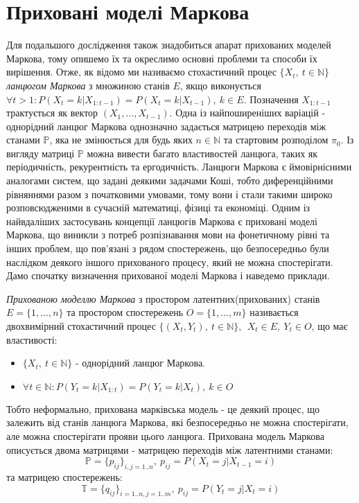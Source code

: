 \section{Приховані моделі Маркова}
Для подальшого дослідження також знадобиться апарат прихованих моделей Маркова, тому опишемо їх та окреслимо основні проблеми та способи їх вирішення.
Отже, як відомо ми називаємо стохастичний процес $ \{ X_t,\ t \in \mathbb{N} \}$ \textit{ланцюгом Маркова} з множиною станів $E$, якщо виконується $ \forall t > 1 \colon P(X_{t} = k | X_{1:t-1}) = P(X_{t} = k | X_{t-1}),\ k \in E $. Позначення $ X_{1:t-1} $ трактується як вектор $ \left( X_1,\dots,X_{t-1} \right) $.
Одна із найпоширеніших варіацій - однорідний ланцюг Маркова однозначно задається матрицею переходів між станами $\mathbb{P}$, яка не змінюється для будь яких $n \in \mathbb{N}$ та стартовим розподілом $\pi_0$. Із вигляду матриці $ \mathbb{P} $ можна вивести багато властивостей ланцюга, таких як періодичність, рекурентність та ергодичність. Ланцюги Маркова є ймовірнісними аналогами систем, що задані деякими задачами Коші, тобто диференційними рівняннями разом з початковими умовами, тому вони і стали такими широко розповсюдженими в сучасній математиці, фізиці та економіці.
Одним із найвдаліших застосувань концепції ланцюгів Маркова є приховані моделі Маркова, що виникли з потреб розпізнавання мови на фонетичному рівні та інших проблем, що пов'язані з рядом спостережень, що безпосередньо були наслідком деякого іншого прихованого процесу, який не можна спостерігати. Дамо спочатку визначення прихованої моделі Маркова і наведемо приклади.
\begin{definition}
  \textit{Прихованою моделлю Маркова} з простором латентних(прихованих) станів $E = \{ 1,\dots,n \}$ та простором спостережень $O = \{ 1,\dots,m \}$ називається двохвимірний стохастичний процес $ \{ (X_t, Y_t),\ t \in \mathbb{N} \},\ \ X_t \in E,\ Y_t \in O $, що має властивості:
  \begin{itemize}
    \item $ \{ X_t,\ t \in \mathbb{N} \} $ - однорідний ланцюг Маркова.
    \item $ \forall t \in \mathbb{N} \colon P(Y_t = k | X_{1:t}) = P(Y_t = k | X_t),\ k \in O $
  \end{itemize}
\end{definition}
Тобто неформально, прихована марківська модель - це деякий процес, що залежить від станів ланцюга Маркова, які безпосередньо не можна спостерігати, але можна спостерігати прояви цього ланцюга. Прихована модель Маркова описується двома матрицями - матрицею переходів між латентними станами:
$$ \mathbb{P} = \{ p_{ij} \}_{i,j=1..n},\ p_{ij} = P(X_t = j | X_{t-1} = i) $$
та матрицею спостережень:
$$ \mathbb{T} = \{ q_{ij} \}_{i=1..n, j=1..m},\ p_{ij} = P(Y_t = j | X_t = i) $$

